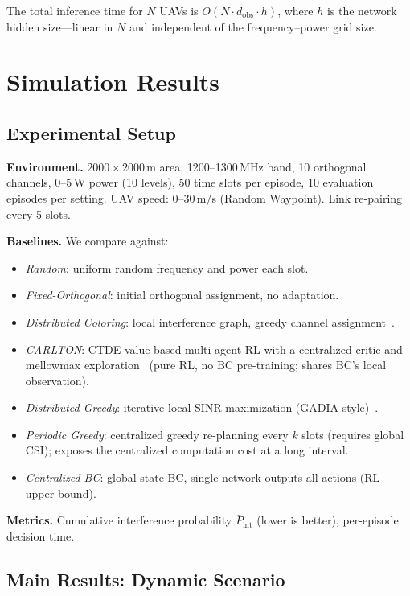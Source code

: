 \documentclass[journal]{IEEEtran}
\begin{document}
The total inference time for $N$ UAVs is $O(N \cdot d_{\text{obs}} \cdot h)$, where $h$ is the network hidden size---linear in $N$ and independent of the frequency--power grid size.

\section{Simulation Results}
\label{sec:simresults}

\subsection{Experimental Setup}

\textbf{Environment.} $2000 \times 2000$\,m area, 1200--1300\,MHz band, 10 orthogonal channels, 0--5\,W power (10 levels), 50 time slots per episode, 10 evaluation episodes per setting. UAV speed: 0--30\,m/s (Random Waypoint). Link re-pairing every 5 slots.

\textbf{Baselines.} We compare against:
\begin{itemize}
    \item \textit{Random}: uniform random frequency and power each slot.
    \item \textit{Fixed-Orthogonal}: initial orthogonal assignment, no adaptation.
    \item \textit{Distributed Coloring}: local interference graph, greedy channel assignment~\cite{ref_coloring}.
    \item \textit{CARLTON}: CTDE value-based multi-agent RL with a centralized critic and mellowmax exploration~\cite{ref_carlton} (pure RL, no BC pre-training; shares BC's local observation).
    \item \textit{Distributed Greedy}: iterative local SINR maximization (GADIA-style)~\cite{ref_gadia}.
    \item \textit{Periodic Greedy}: centralized greedy re-planning every $k$ slots (requires global CSI); exposes the centralized computation cost at a long interval.
    \item \textit{Centralized BC}: global-state BC, single network outputs all actions (RL upper bound).
\end{itemize}

\textbf{Metrics.} Cumulative interference probability $\bar{P}_{\text{int}}$ (lower is better), per-episode decision time.

\subsection{Main Results: Dynamic Scenario}
\label{sec:main_results}
\end{document}
